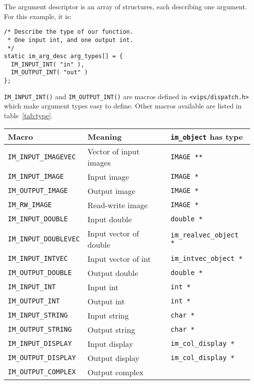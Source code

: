 The argument descriptor is an array of structures, each describing one
argument.  For this example, it is:

\begin{verbatim}
/* Describe the type of our function. 
 * One input int, and one output int.
 */
static im_arg_desc arg_types[] = {
  IM_INPUT_INT( "in" ),
  IM_OUTPUT_INT( "out" )
};
\end{verbatim}

\verb+IM_INPUT_INT()+ and \verb+IM_OUTPUT_INT()+ are macros defined in
\verb+<vips/dispatch.h>+ which make argument types easy to define. Other
macros available are listed in table~\ref{tab:type}.

\begin{tab2}
\begin{center}
\begin{tabular}{|l|l|l|}
\hline
Macro				& Meaning	& 
	\texttt{im\_object} has type \\
\hline
\texttt{IM\_INPUT\_IMAGEVEC} 	& Vector of input images	& 
	\texttt{IMAGE **} \\
\texttt{IM\_INPUT\_IMAGE} 	& Input image			& 
	\texttt{IMAGE *} \\
\texttt{IM\_OUTPUT\_IMAGE} 	& Output image			& 
	\texttt{IMAGE *} \\
\texttt{IM\_RW\_IMAGE} 		& Read-write image		& 
	\texttt{IMAGE *} \\
\texttt{IM\_INPUT\_DOUBLE} 	& Input double			& 
	\texttt{double *} \\
\texttt{IM\_INPUT\_DOUBLEVEC} 	& Input vector of double	& 
	\texttt{im\_realvec\_object *} \\
\texttt{IM\_INPUT\_INTVEC} 	& Input vector of int		& 
	\texttt{im\_intvec\_object *} \\
\texttt{IM\_OUTPUT\_DOUBLE}	& Output double			& 
	\texttt{double *} \\
\texttt{IM\_INPUT\_INT} 	& Input int			& 
	\texttt{int *} \\
\texttt{IM\_OUTPUT\_INT} 	& Output int			& 
	\texttt{int *} \\
\texttt{IM\_INPUT\_STRING}	& Input string			& 
	\texttt{char *} \\
\texttt{IM\_OUTPUT\_STRING}	& Output string			& 
	\texttt{char *} \\
\texttt{IM\_INPUT\_DISPLAY}	& Input display			& 
	\texttt{im\_col\_display *} \\
\texttt{IM\_OUTPUT\_DISPLAY}	& Output display		& 
	\texttt{im\_col\_display *} \\
\texttt{IM\_OUTPUT\_COMPLEX} 	& Output complex		& 

\end{tabular}
\end{center}
\end{tab2}
